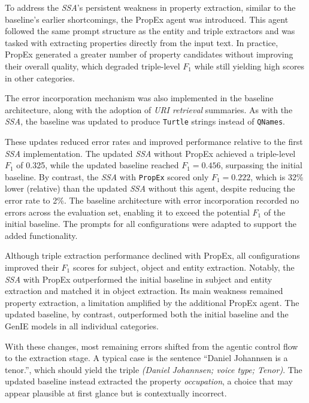 \documentclass[a4paper,oneside,bibliography=totoc]{scrbook}
\begin{document}
To address the \textit{\ac{SSA}}’s persistent weakness in property extraction, similar to the baseline’s earlier shortcomings, the \ac{PropEx} agent was introduced. This agent followed the same prompt structure as the entity and triple extractors and was tasked with extracting properties directly from the input text. In practice, \ac{PropEx} generated a greater number of property candidates without improving their overall quality, which degraded triple-level $F_{1}$ while still yielding high scores in other categories.

The error incorporation mechanism was also implemented in the baseline architecture, along with the adoption of \textit{\ac{URI} retrieval} summaries. As with the \textit{\ac{SSA}}, the baseline was updated to produce \texttt{Turtle} strings instead of \texttt{QNames}.

These updates reduced error rates and improved performance relative to the first \textit{\ac{SSA}} implementation. The updated \textit{\ac{SSA}} without \ac{PropEx} achieved a triple-level $F_{1}$ of 0.325, while the updated baseline reached $F_{1}=0.456$, surpassing the initial baseline. By contrast, the \textit{\ac{SSA}} with \texttt{PropEx} scored only $F_{1}=0.222$, which is 32\% lower (relative) than the updated \textit{\ac{SSA}} without this agent, despite reducing the error rate to 2\%. The baseline architecture with error incorporation recorded no errors across the evaluation set, enabling it to exceed the potential $F_{1}$ of the initial baseline. The prompts for all configurations were adapted to support the added functionality.

Although triple extraction performance declined with \ac{PropEx}, all configurations improved their $F_{1}$ scores for subject, object and entity extraction. Notably, the \textit{\ac{SSA}} with \ac{PropEx} outperformed the initial baseline in subject and entity extraction and matched it in object extraction. Its main weakness remained property extraction, a limitation amplified by the additional \ac{PropEx} agent. The updated baseline, by contrast, outperformed both the initial baseline and the GenIE models in all individual categories.

With these changes, most remaining errors shifted from the agentic control flow to the extraction stage. A typical case is the sentence \enquote{Daniel Johannsen is a tenor.}, which should yield the triple \textit{(Daniel Johannsen; voice type; Tenor)}. The updated baseline instead extracted the property \textit{occupation}, a choice that may appear plausible at first glance but is contextually incorrect.
\end{document}
